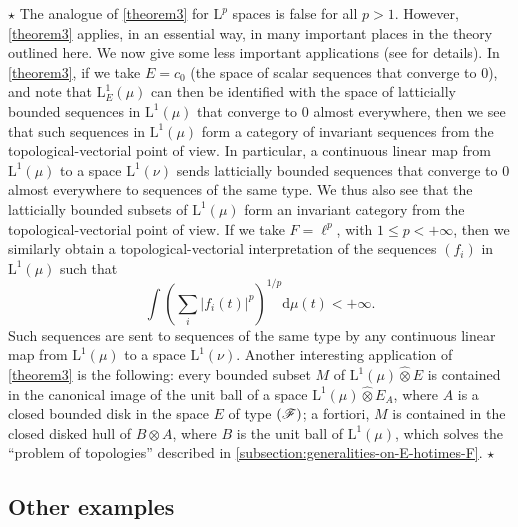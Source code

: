 \documentclass{article}
\theoremstyle{plain}
\newcommand{\aster}[1]{$\star${#1}$\star$}
\newcommand{\LL}{\mathrm{L}}
\renewcommand{\ll}{\ell}
\newcommand{\FF}{\mbox{\normalfont($\mathscr{F}$)}}
\newcommand{\hotimes}{\widehat{\otimes}}
\newcommand{\dd}{\mathrm{d}}
\begin{document}
\aster{%
  The analogue of \cref{theorem3} for $\LL^p$ spaces is false for all $p>1$.
  However, \cref{theorem3} applies, in an essential way, in many important places in the theory outlined here.
  We now give some less important applications (see \cite[chap.~1, \S2, n\textsuperscript{o}~2]{PTT} for details).
  In \cref{theorem3}, if we take $E=c_0$ (the space of scalar sequences that converge to $0$), and note that $\LL_E^1(\mu)$ can then be identified with the space of latticially bounded sequences in $\LL^1(\mu)$ that converge to $0$ almost everywhere, then we see that such sequences in $\LL^1(\mu)$ form a category of invariant sequences from the topological-vectorial point of view.
  In particular, a continuous linear map from $\LL^1(\mu)$ to a space $\LL^1(\nu)$ sends latticially bounded sequences that converge to $0$ almost everywhere to sequences of the same type.
  We thus also see that the latticially bounded subsets of $\LL^1(\mu)$ form an invariant category from the topological-vectorial point of view.
  If we take $F=\ll^p$, with $1\leq p<+\infty$, then we similarly obtain a topological-vectorial interpretation of the sequences $(f_i)$ in $\LL^1(\mu)$ such that
  \[
    \int \left(
      \sum_i |f_i(t)|^p
    \right)^{1/p}
    \dd\mu(t) < +\infty.
  \]
  Such sequences are sent to sequences of the same type by any continuous linear map from $\LL^1(\mu)$ to a space $\LL^1(\nu)$.
  Another interesting application of \cref{theorem3} is the following: every bounded subset $M$ of $\LL^1(\mu)\hotimes E$ is contained in the canonical image of the unit ball of a space $\LL^1(\mu)\hotimes E_A$, where $A$ is a closed bounded disk in the space $E$ of type $\FF$;
  a fortiori, $M$ is contained in the closed disked hull of $B\otimes A$, where $B$ is the unit ball of $\LL^1(\mu)$, which solves the ``problem of topologies'' described in \cref{subsection:generalities-on-E-hotimes-F}.
}


\subsection{Other examples}
\label{subsection:other-examples}
\end{document}
